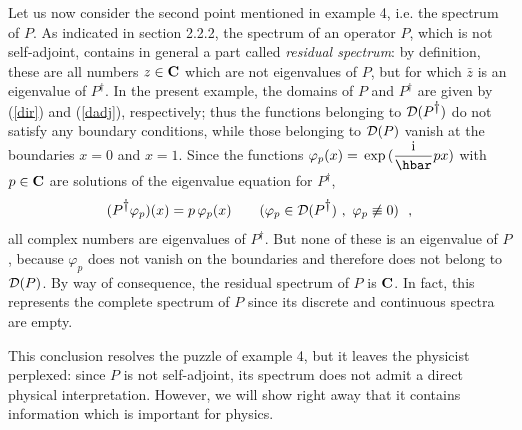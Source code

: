 \documentclass[12pt]{report}
\def\underline{\relax}
\begin{document}
\underline{{\bf (4b)}}
Let us now consider the second point mentioned in example 4, 
i.e. the spectrum of $P$.
As indicated in section 2.2.2, 
the spectrum of an 
operator $P$, which is not self-adjoint, 
contains in general
a part called {\em residual spectrum}:
by definition, these are all numbers $z \in {\bf C}$
which are not eigenvalues of $P$, but for which $\bar z$
is an eigenvalue of $P^{\dag}$.
In the present example, the domains of $P$ and $P^{\dag}$
are given by 
(\ref{dir}) and (\ref{dadj}), respectively;
thus the functions belonging to ${\cal D}(P^{\dag})$
do not satisfy any boundary conditions, while
those belonging to ${\cal D}(P)$ vanish at the boundaries
$x=0$ and $x=1$. 
Since the functions 
$\varphi_p (x)=  \, {\rm exp} \, ( \ds{\ri \over \hbar} px )$
 with $p \in \bc$ are solutions
of the eigenvalue equation for 
$P^{\dag}$,
\begin{equation}
\label{spr}
(P^{\dag} \varphi_p)(x) = p \,  \varphi_p(x)
\qquad ( \varphi_p \in {\cal D}(P^{\dag})
\ , \ \varphi_p \not \equiv 0 )
\ \ ,
\end{equation}
all complex numbers are eigenvalues of $P^{\dag}$.
But none of these is an eigenvalue of $P$, because 
$\varphi_p$ does not vanish on the boundaries and therefore
does not belong to ${\cal D}(P)$. 
By way of consequence, the residual spectrum of $P$ is $\bc$. 
In fact, this represents the 
 complete spectrum of $P$ since its  
discrete and continuous spectra
are empty. 

This conclusion resolves the puzzle of example 4, 
but it leaves the physicist perplexed: 
since $P$ is not 
 self-adjoint, its spectrum does not admit a direct 
 physical interpretation. However, we will show right away 
 that it contains information which is important for physics. 
\end{document}
